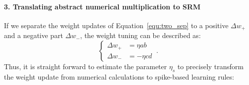 

\paragraph{3. Translating abstract numerical multiplication to SRM\\}
If we separate the weight updates of Equation~\ref{equ:two_sep} to a positive $\Delta w_+$ and a negative part $\Delta w_-$, the weight tuning can be described as:
\begin{equation}
\left\{
\begin{aligned} 
\Delta w_+ &= \eta ab\\
\Delta w_- &= -\eta cd
\end{aligned}
\right.~.
\end{equation}
Thus, it is straight forward to estimate the parameter $\eta_s$ to precisely transform the weight update from numerical calculations to spike-based learning rules:
